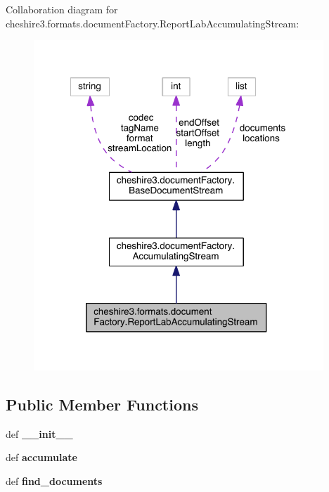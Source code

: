 Collaboration diagram for cheshire3.\-formats.\-document\-Factory.\-Report\-Lab\-Accumulating\-Stream\-:
\nopagebreak
\begin{figure}[H]
\begin{center}
\leavevmode
\includegraphics[width=309pt]{classcheshire3_1_1formats_1_1document_factory_1_1_report_lab_accumulating_stream__coll__graph}
\end{center}
\end{figure}
\subsection*{Public Member Functions}
\begin{DoxyCompactItemize}
\item 
\hypertarget{classcheshire3_1_1formats_1_1document_factory_1_1_report_lab_accumulating_stream_a76202698491e4f47c6c61569d8f076a5}{def {\bfseries \-\_\-\-\_\-init\-\_\-\-\_\-}}\label{classcheshire3_1_1formats_1_1document_factory_1_1_report_lab_accumulating_stream_a76202698491e4f47c6c61569d8f076a5}

\item 
\hypertarget{classcheshire3_1_1formats_1_1document_factory_1_1_report_lab_accumulating_stream_ae61d8256c5643e562da3aa02a6b221c6}{def {\bfseries accumulate}}\label{classcheshire3_1_1formats_1_1document_factory_1_1_report_lab_accumulating_stream_ae61d8256c5643e562da3aa02a6b221c6}

\item 
\hypertarget{classcheshire3_1_1formats_1_1document_factory_1_1_report_lab_accumulating_stream_af382cc849ce67465877ec579ccc4ac04}{def {\bfseries find\-\_\-documents}}\label{classcheshire3_1_1formats_1_1document_factory_1_1_report_lab_accumulating_stream_af382cc849ce67465877ec579ccc4ac04}

\end{DoxyCompactItemize}
